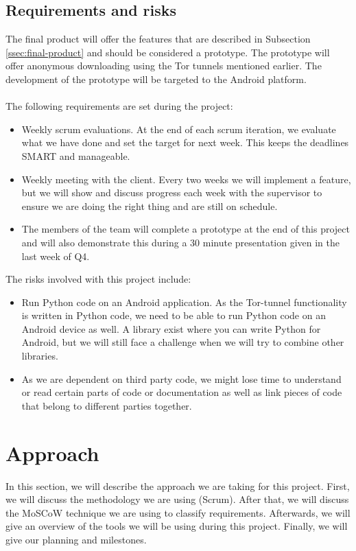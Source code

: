 \subsection{Requirements and risks}
The final product will offer the features that are described in Subsection \ref{ssec:final-product} and should be considered a prototype. The prototype will offer anonymous downloading using the Tor tunnels mentioned earlier. The development of the prototype will be targeted to the Android platform.\\\\
The following requirements are set during the project:

\begin{itemize}
\item Weekly scrum evaluations. At the end of each scrum iteration, we evaluate what we have done and set the target for next week. This keeps the deadlines SMART and manageable.
\item Weekly meeting with the client. Every two weeks we will implement a feature, but we will show and discuss progress each week with the supervisor to ensure we are doing the right thing and are still on schedule.
\item The members of the team will complete a prototype at the end of this project and will also demonstrate this during a 30 minute presentation given in the last week of Q4.
\end{itemize}

The risks involved with this project include:
\begin{itemize}
\item Run Python code on an Android application. As the Tor-tunnel functionality is written in Python code, we need to be able to run Python code on an Android device as well. A library exist where you can write Python for Android, but we will still face a challenge when we will try to combine other libraries.
\item As we are dependent on third party code, we might lose time to understand or read certain parts of code or documentation as well as link pieces of code that belong to different parties together.
\end{itemize}



\section{Approach}
In this section, we will describe the approach we are taking for this project. First, we will discuss the methodology we are using (Scrum). After that, we will discuss the MoSCoW technique we are using to classify requirements. Afterwards, we will give an overview of the tools we will be using during this project. Finally, we will give our planning and milestones.


